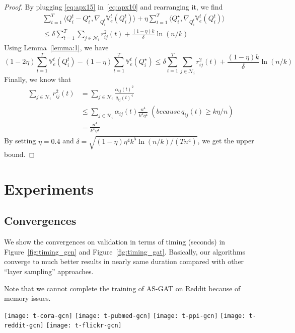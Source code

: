 \documentclass{article}
\begin{document}
\begin{proof}
By plugging \eqref{eq:apx15} in~\eqref{eq:apx10} and rearranging it, we find
{\footnotesize
\begin{align}
	&\sum_{t=1}^T\langle Q_{i}^t-Q_{i}^{\star}, \nabla_{Q_i^t}\mathbb{V}_e^t(Q_{i}^t)\rangle + \eta\sum_{t=1}^T\langle Q_i^{\star}, \nabla_{Q_i^t}\mathbb{V}_e^t(Q_i^{t})\rangle \\\nonumber
& \leq \delta\sum_{t=1}^T\sum_{j\in\mathcal{N}_i}r_{ij}^2(t) + \frac{(1-\eta)k}{\delta}\ln (n/k)
\end{align}
}
Using Lemma~\ref{lemma:1}, we have
{\footnotesize
\begin{equation}
	(1-2\eta)\sum_{t=1}^T\mathbb{V}_e^t(Q_i^t)-(1-\eta)\sum_{t=1}^T\mathbb{V}_e^t(Q_i^{\star})\leq \delta\sum_{t=1}^T\sum_{j\in\mathcal{N}_i}r_{ij}^2(t) + \frac{(1-\eta)k}{\delta}\ln (n/k)
\end{equation}
}
Finally, we know that 
{\footnotesize
\begin{align}
	\sum_{j\in \mathcal{N}_i}r_{ij}^2(t)&=\sum_{j\in\mathcal{N}_i}\frac{\alpha_{ij}(t)^2}{q_{ij}(t)^4} \\
	&\leq \sum_{j\in\mathcal{N}_i}\alpha_{ij}(t)\frac{n^4}{k^4\eta^4} \; (because\, q_{ij}(t)\geq k\eta/n) \\
	&= \frac{n^4}{k^4\eta^4}
\end{align}
}
By setting $\eta=0.4$ and $\delta=\sqrt{(1-\eta)\eta^4 k^5 \ln(n/k)/(T n^4)}$, we get the upper bound.

\end{proof}





\section{Experiments}


\subsection{Convergences}\label{appendix:convergences}
We show the convergences on validation in terms of timing (seconds)
in Figure~\ref{fig:timing_gcn} and Figure~\ref{fig:timing_gat}. Basically, our algorithms converge
to much better results in nearly same duration compared with other
``layer sampling'' approaches.

Note that we cannot complete the training of AS-GAT on Reddit
because of memory issues.

\begin{figure*}[h]
\texttt{[image: t-cora-gcn]}
\texttt{[image: t-pubmed-gcn]}
\texttt{[image: t-ppi-gcn]}
\texttt{[image: t-reddit-gcn]}
\texttt{[image: t-flickr-gcn]}
\caption{The convergence in timing (seconds) on GCNs.}
\label{fig:timing_gcn}
\end{figure*}
\end{document}
